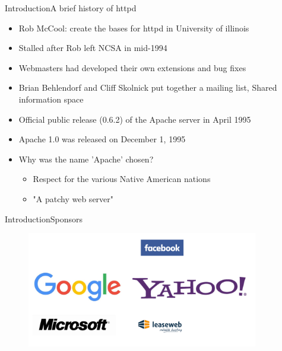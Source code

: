 \documentclass[10pt]{beamer}
\begin{document}
\begin{frame}{Introduction}{A brief history of httpd}
  \begin{itemize}
    \item Rob McCool: create the bases for httpd in University of illinois \pause
    \item Stalled after Rob left NCSA in mid-1994 \pause
    \item Webmasters had developed their own extensions and bug fixes \pause
    \item Brian Behlendorf and Cliff Skolnick put together a mailing list,
          Shared information space \pause
    \item Official public release (0.6.2) of the Apache server in April 1995 \pause
    \item Apache 1.0 was released on December 1, 1995 \pause
    \item Why was the name 'Apache' chosen? \pause
    \begin{itemize}
      \item Respect for the various Native American nations \pause
      \item "A patchy web server"
    \end{itemize}
  \end{itemize}
\end{frame}

\begin{frame}{Introduction}{Sponsors}
  \begin{figure}[ht]
    \centering
    \includegraphics[width=0.9\textwidth, keepaspectratio=true]{images/sponsors.png}
  \end{figure} 
\end{frame}

\end{document}
